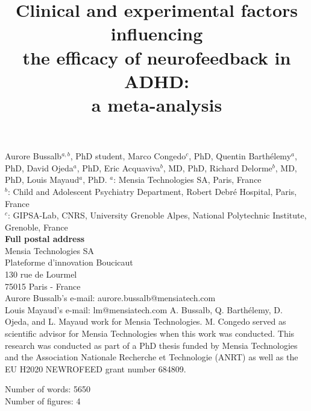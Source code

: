 

\title{Clinical and experimental factors influencing \\ the efficacy of neurofeedback in ADHD: \\ a meta-analysis} %
\maketitle
\noindent Aurore Bussalb$^{a, b}$, PhD student, Marco Congedo$^c$, PhD, Quentin Barth\'elemy$^a$, PhD, David Ojeda$^a$, PhD, 
Eric Acquaviva$^b$, MD, PhD, Richard Delorme$^b$, MD, PhD, Louis Mayaud$^a$, PhD. 
\smallbreak
\noindent $^a$: Mensia Technologies SA, Paris, France \\
\noindent $^b$: Child and Adolescent Psychiatry Department, Robert Debré Hospital, Paris, France \\ 
\noindent $^c$: GIPSA-Lab, CNRS, University Grenoble Alpes, National Polytechnic Institute, Grenoble, France \\
\smallbreak
\noindent\textbf{Full postal address} \\
Mensia Technologies SA\\
Plateforme d'innovation Boucicaut \\
130 rue de Lourmel \\
75015 Paris - France \\
Aurore Bussalb's e-mail: aurore.bussalb@mensiatech.com \\
Louis Mayaud's e-mail: lm@mensiatech.com 
\smallbreak
\noindent A. Bussalb, Q. Barth\'elemy, D. Ojeda, and L. Mayaud work for Mensia Technologies.
M. Congedo served as scientific advisor for Mensia Technologies when this work was conducted. 
\smallbreak
\noindent This research was conducted as part of a PhD thesis funded by Mensia Technologies and the Association Nationale 
Recherche et Technologie (ANRT) as well as the EU H2020 NEWROFEED grant number 684809.

\noindent Number of words: 5650 \\
\noindent Number of figures: 4 
